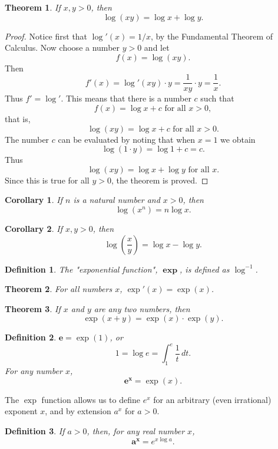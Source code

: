 \documentclass{article}
\newtheorem{corollary}{Corollary}
\numberwithin{corollary}{subsection}
\newtheorem{definition}{Definition}
\numberwithin{definition}{subsection}
\numberwithin{lemma}{subsection}
\newtheorem{theorem}{Theorem}
\numberwithin{theorem}{subsection}
\begin{document}
\begin{theorem}
  If $x, y > 0$, then \[ \log(xy) = \log x + \log y. \]
\end{theorem}
\begin{proof}
  Notice first that $\log'(x) = 1/x$, by the Fundamental Theorem of Calculus.
  Now choose a number $y > 0$ and let \[ f(x) = \log(xy). \] Then \[ f'(x) =
  \log'(xy) \cdot y = \frac{1}{xy} \cdot y = \frac{1}{x}. \] Thus $f' = \log'$.
  This means that there is a number $c$ such that \[
    f(x) = \log x + c
    \text{ for all } x > 0,
  \] that is, \[
    \log(xy) = \log x + c
    \text{ for all } x > 0.
  \] The number $c$ can be evaluated by noting that when $x = 1$ we obtain \[
    \log(1 \cdot y) = \log 1 + c = c.
  \] Thus \[
    \log(xy) = \log x + \log y
    \text{ for all } x.
  \] Since this is true for all $y > 0$, the theorem is proved.
\end{proof}

\begin{corollary}
  If $n$ is a natural number and $x > 0$, then \[ \log(x^n) = n\log x. \]
\end{corollary}

\begin{corollary}
  If $x, y > 0$, then \[ \log\left(\frac{x}{y}\right) = \log x - \log y. \]
\end{corollary}

\begin{definition}
  The "exponential function", $\pmb{\exp}$, is defined as $\log^{-1}$.
\end{definition}

\begin{theorem}
  For all numbers $x$, $\exp'(x) = \exp(x)$.
\end{theorem}

\begin{theorem}
  If $x$ and $y$ are any two numbers, then \[ \exp(x + y) = \exp(x) \cdot
  \exp(y). \]
\end{theorem}

\begin{definition}
  $\pmb{e} = \exp(1)$, or \[ 1 = \log e = \int_1^e \frac{1}{t} \,dt. \] For any
  number $x$, \[ \pmb{e^x} = \exp(x). \]
\end{definition}

The $\exp$ function allows us to define $e^x$ for an arbitrary (even
irrational) exponent $x$, and by extension $a^x$ for $a > 0$.

\begin{definition}
  If $a > 0$, then, for any real number $x$, \[ \pmb{a^x} = e^{x\log a}. \]
\end{definition}
\end{document}
